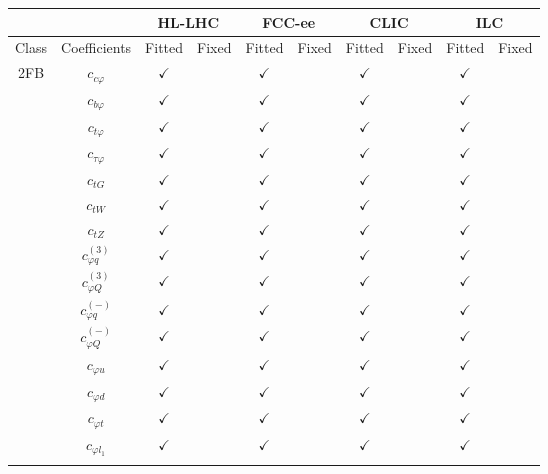 \documentclass{article}
\begin{document}
\begin{table}[H]
\centering
\begin{tabular}{|c|c|c|c|c|c|c|c|c|c|}
\hline
 &  & \multicolumn{2}{c|}{HL-LHC} & \multicolumn{2}{c|}{FCC-ee} & \multicolumn{2}{c|}{CLIC} & \multicolumn{2}{c|}{ILC} \\ \hline
Class & Coefficients & Fitted & Fixed  & Fitted & Fixed  & Fitted & Fixed  & Fitted & Fixed  \\ \hline
\multirow{23}{*}{2FB}
 & $c_{c \varphi}$ & $\checkmark$ &  & $\checkmark$ &  & $\checkmark$ &  & $\checkmark$ & \\ \cline{2-10}
 & $c_{b \varphi}$ & $\checkmark$ &  & $\checkmark$ &  & $\checkmark$ &  & $\checkmark$ & \\ \cline{2-10}
 & $c_{t \varphi}$ & $\checkmark$ &  & $\checkmark$ &  & $\checkmark$ &  & $\checkmark$ & \\ \cline{2-10}
 & $c_{\tau \varphi}$ & $\checkmark$ &  & $\checkmark$ &  & $\checkmark$ &  & $\checkmark$ & \\ \cline{2-10}
 & $c_{tG}$ & $\checkmark$ &  & $\checkmark$ &  & $\checkmark$ &  & $\checkmark$ & \\ \cline{2-10}
 & $c_{tW}$ & $\checkmark$ &  & $\checkmark$ &  & $\checkmark$ &  & $\checkmark$ & \\ \cline{2-10}
 & $c_{tZ}$ & $\checkmark$ &  & $\checkmark$ &  & $\checkmark$ &  & $\checkmark$ & \\ \cline{2-10}
 & $c_{\varphi q}^{(3)}$ & $\checkmark$ &  & $\checkmark$ &  & $\checkmark$ &  & $\checkmark$ & \\ \cline{2-10}
 & $c_{\varphi Q}^{(3)}$ & $\checkmark$ &  & $\checkmark$ &  & $\checkmark$ &  & $\checkmark$ & \\ \cline{2-10}
 & $c_{\varphi q}^{(-)}$ & $\checkmark$ &  & $\checkmark$ &  & $\checkmark$ &  & $\checkmark$ & \\ \cline{2-10}
 & $c_{\varphi Q}^{(-)}$ & $\checkmark$ &  & $\checkmark$ &  & $\checkmark$ &  & $\checkmark$ & \\ \cline{2-10}
 & $c_{\varphi u}$ & $\checkmark$ &  & $\checkmark$ &  & $\checkmark$ &  & $\checkmark$ & \\ \cline{2-10}
 & $c_{\varphi d}$ & $\checkmark$ &  & $\checkmark$ &  & $\checkmark$ &  & $\checkmark$ & \\ \cline{2-10}
 & $c_{\varphi t}$ & $\checkmark$ &  & $\checkmark$ &  & $\checkmark$ &  & $\checkmark$ & \\ \cline{2-10}
 & $c_{\varphi l_1}$ & $\checkmark$ &  & $\checkmark$ &  & $\checkmark$ &  & $\checkmark$ & \\ \cline{2-10}

\end{tabular}
\end{table}
\end{document}
